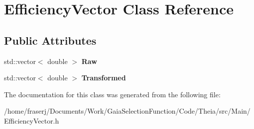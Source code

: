 \hypertarget{classEfficiencyVector}{}\section{Efficiency\+Vector Class Reference}
\label{classEfficiencyVector}
\subsection*{Public Attributes}
\begin{DoxyCompactItemize}
\item 
\mbox{\label{classEfficiencyVector_a138e823e4829aadd9e43b475848804cf}} 
std\+::vector$<$ double $>$ {\bfseries Raw}
\item 
\mbox{\label{classEfficiencyVector_af4687a6e7c72f35b35310e2368335b25}} 
std\+::vector$<$ double $>$ {\bfseries Transformed}
\end{DoxyCompactItemize}


The documentation for this class was generated from the following file\+:\begin{DoxyCompactItemize}
\item 
/home/fraserj/\+Documents/\+Work/\+Gaia\+Selection\+Function/\+Code/\+Theia/src/\+Main/Efficiency\+Vector.\+h\end{DoxyCompactItemize}
